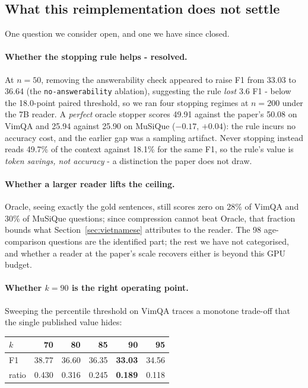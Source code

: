 \documentclass[11pt]{article}
\begin{document}
\subsection{What this reimplementation does not settle}
\label{app:open}
\vspace{-0.5\baselineskip}

One question we consider open, and one we have since closed.

\paragraph{Whether the stopping rule helps - resolved.} At $n=50$, removing the
answerability check appeared to raise F1 from 33.03 to 36.64
(the \texttt{no-answerability} ablation), suggesting the rule
\emph{lost} 3.6 F1 - below the 18.0-point paired threshold, so we ran four
stopping regimes at $n=200$ under the 7B reader. A \emph{perfect} oracle stopper
scores 49.91 against the paper's 50.08 on VimQA and 25.94 against 25.90 on
MuSiQue ($-0.17$, $+0.04$): the rule incurs no accuracy cost, and the earlier gap
was a sampling artifact. Never stopping instead reads 49.7\% of the context
against 18.1\% for the same F1, so the rule's value is \emph{token savings, not
accuracy} - a distinction the paper does not draw.

\paragraph{Whether a larger reader lifts the ceiling.} Oracle, seeing exactly the
gold sentences, still scores zero on 28\% of VimQA and 30\% of MuSiQue questions;
since compression cannot beat Oracle, that fraction bounds what
Section~\ref{sec:vietnamese} attributes to the reader. The 98 age-comparison
questions are the identified part; the rest we have not categorised, and whether
a reader at the paper's scale recovers either is beyond this GPU budget.

\paragraph{Whether $k=90$ is the right operating point.} Sweeping the percentile
threshold on VimQA traces a monotone trade-off that the single published value
hides:

\begin{center}
\small
\begin{tabular}{lrrrrr}
\toprule
$k$ & 70 & 80 & 85 & \textbf{90} & 95 \\
\midrule
F1    & 38.77 & 36.60 & 36.35 & \textbf{33.03} & 34.56 \\
ratio & 0.430 & 0.316 & 0.245 & \textbf{0.189} & 0.118 \\
\bottomrule
\end{tabular}
\end{center}
\end{document}

